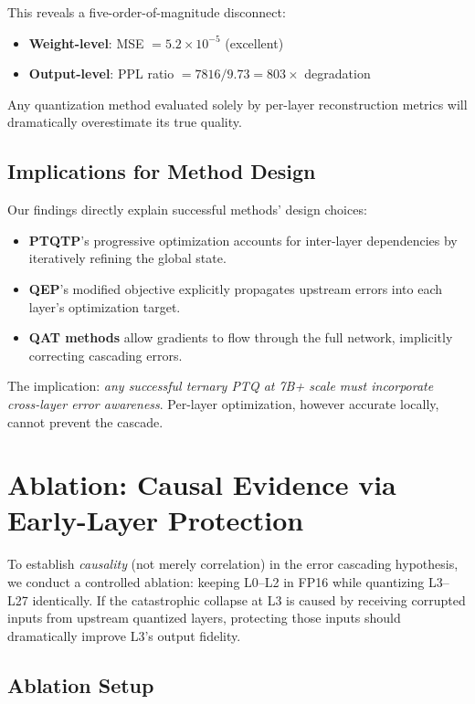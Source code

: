 \documentclass[10pt,a4paper]{article}
\begin{document}
This reveals a five-order-of-magnitude disconnect:
\begin{itemize}
    \item \textbf{Weight-level}: MSE $= 5.2 \times 10^{-5}$ (excellent)
    \item \textbf{Output-level}: PPL ratio $= 7816/9.73 = 803\times$ degradation
\end{itemize}

Any quantization method evaluated solely by per-layer reconstruction metrics will dramatically overestimate its true quality.

\subsection{Implications for Method Design}

Our findings directly explain successful methods' design choices:
\begin{itemize}
    \item \textbf{PTQTP}'s progressive optimization accounts for inter-layer dependencies by iteratively refining the global state.
    \item \textbf{QEP}'s modified objective explicitly propagates upstream errors into each layer's optimization target.
    \item \textbf{QAT methods} allow gradients to flow through the full network, implicitly correcting cascading errors.
\end{itemize}

The implication: \textit{any successful ternary PTQ at 7B+ scale must incorporate cross-layer error awareness}.
Per-layer optimization, however accurate locally, cannot prevent the cascade.

\section{Ablation: Causal Evidence via Early-Layer Protection}
\label{sec:ablation}

To establish \textit{causality} (not merely correlation) in the error cascading hypothesis, we conduct a controlled ablation: keeping L0--L2 in FP16 while quantizing L3--L27 identically.
If the catastrophic collapse at L3 is caused by receiving corrupted inputs from upstream quantized layers, protecting those inputs should dramatically improve L3's output fidelity.

\subsection{Ablation Setup}
\end{document}
